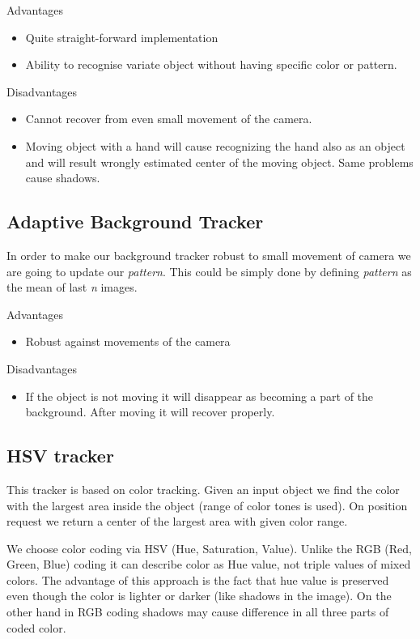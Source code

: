 
Advantages
\begin{itemize}
\item Quite straight-forward implementation
\item Ability to recognise variate object without having specific color or pattern.
\end{itemize}

Disadvantages
\begin{itemize}
\item Cannot recover from even small movement of the camera.
\item Moving object with a hand will cause recognizing the hand also as an object and will result wrongly estimated center of the moving object. Same problems cause shadows.
\end{itemize}

\subsection{Adaptive Background Tracker}

In order to make our background tracker robust to small movement of camera we
are going to update our \emph{pattern}. This could be simply done by defining \emph{pattern}
as the mean of last \emph{n} images.

Advantages
\begin{itemize}
\item Robust against movements of the camera
\end{itemize}

Disadvantages
\begin{itemize}
\item If the object is not moving it will disappear as becoming a part of the
background. After moving it will recover properly.
\end{itemize}

\subsection{HSV tracker}

This tracker is based on color tracking. Given an input object we find the
color with the largest area inside the object (range of color tones is used).
On position request we return a center of the largest area with given color
range.

We choose color coding via HSV (Hue, Saturation, Value). Unlike the RGB (Red,
Green, Blue) coding it can describe color as Hue value, not triple values of
mixed colors. The advantage of this approach is the fact that hue value is
preserved even though the color is lighter or darker (like shadows in the
image). On the other hand in RGB coding shadows may cause difference in all
three parts of coded color.

